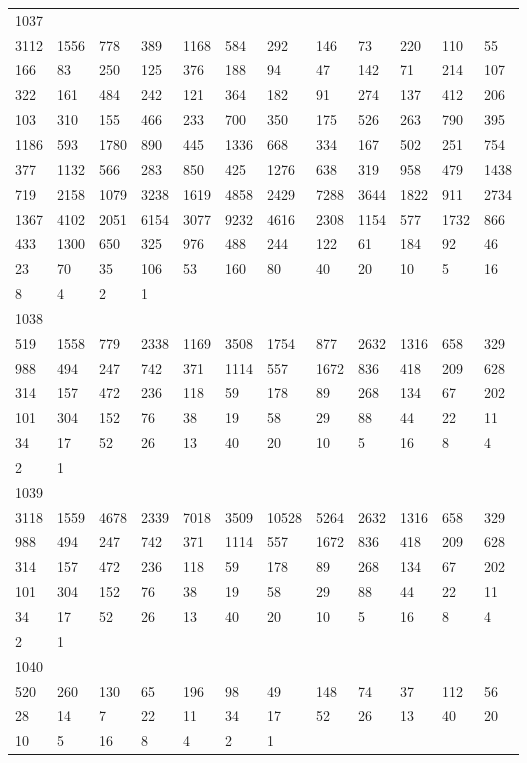 \begin{longtable}{llllllllllll}
1037&&&&&&&&&&&\\
3112& 1556& 778& 389& 1168& 584& 292& 146& 73& 220& 110& 55\\
166& 83& 250& 125& 376& 188& 94& 47& 142& 71& 214& 107\\
322& 161& 484& 242& 121& 364& 182& 91& 274& 137& 412& 206\\
103& 310& 155& 466& 233& 700& 350& 175& 526& 263& 790& 395\\
1186& 593& 1780& 890& 445& 1336& 668& 334& 167& 502& 251& 754\\
377& 1132& 566& 283& 850& 425& 1276& 638& 319& 958& 479& 1438\\
719& 2158& 1079& 3238& 1619& 4858& 2429& 7288& 3644& 1822& 911& 2734\\
1367& 4102& 2051& 6154& 3077& 9232& 4616& 2308& 1154& 577& 1732& 866\\
433& 1300& 650& 325& 976& 488& 244& 122& 61& 184& 92& 46\\
23& 70& 35& 106& 53& 160& 80& 40& 20& 10& 5& 16\\
8& 4& 2& 1& \\

1038&&&&&&&&&&&\\
519& 1558& 779& 2338& 1169& 3508& 1754& 877& 2632& 1316& 658& 329\\
988& 494& 247& 742& 371& 1114& 557& 1672& 836& 418& 209& 628\\
314& 157& 472& 236& 118& 59& 178& 89& 268& 134& 67& 202\\
101& 304& 152& 76& 38& 19& 58& 29& 88& 44& 22& 11\\
34& 17& 52& 26& 13& 40& 20& 10& 5& 16& 8& 4\\
2& 1& \\

1039&&&&&&&&&&&\\
3118& 1559& 4678& 2339& 7018& 3509& 10528& 5264& 2632& 1316& 658& 329\\
988& 494& 247& 742& 371& 1114& 557& 1672& 836& 418& 209& 628\\
314& 157& 472& 236& 118& 59& 178& 89& 268& 134& 67& 202\\
101& 304& 152& 76& 38& 19& 58& 29& 88& 44& 22& 11\\
34& 17& 52& 26& 13& 40& 20& 10& 5& 16& 8& 4\\
2& 1& \\

1040&&&&&&&&&&&\\
520& 260& 130& 65& 196& 98& 49& 148& 74& 37& 112& 56\\
28& 14& 7& 22& 11& 34& 17& 52& 26& 13& 40& 20\\
10& 5& 16& 8& 4& 2& 1& \\


\end{longtable}
